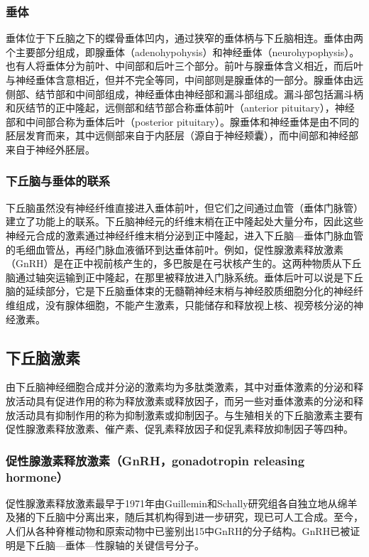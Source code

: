 \subsubsection{垂体}

垂体位于下丘脑之下的蝶骨垂体凹内，通过狭窄的垂体柄与下丘脑相连。垂体由两个主要部分组成，即腺垂体（adenohypohysis）和神经垂体（neurohypophysis）。也有人将垂体分为前叶、中间部和后叶三个部分。前叶与腺垂体含义相近，而后叶与神经垂体含意相近，但并不完全等同，中间部则是腺垂体的一部分。腺垂体由远侧部、结节部和中间部组成，神经垂体由神经部和漏斗部组成。漏斗部包括漏斗柄和灰结节的正中隆起，远侧部和结节部合称垂体前叶（anterior pituitary），神经部和中间部合称为垂体后叶（posterior pituitary）。腺垂体和神经垂体是由不同的胚层发育而来，其中远侧部来自于内胚层（源自于神经颊囊），而中间部和神经部来自于神经外胚层。

\subsubsection{下丘脑与垂体的联系}

下丘脑虽然没有神经纤维直接进入垂体前叶，但它们之间通过血管（垂体门脉管）建立了功能上的联系。下丘脑神经元的纤维末梢在正中隆起处大量分布，因此这些神经元合成的激素通过神经纤维末梢分泌到正中隆起，进入下丘脑---垂体门脉血管的毛细血管丛，再经门脉血液循环到达垂体前叶。例如，促性腺激素释放激素（GnRH）是在正中视前核产生的，多巴胺是在弓状核产生的。这两种物质从下丘脑通过轴突运输到正中隆起，在那里被释放进入门脉系统。垂体后叶可以说是下丘脑的延续部分，它是下丘脑垂体束的无髓鞘神经末梢与神经胶质细胞分化的神经纤维组成，没有腺体细胞，不能产生激素，只能储存和释放视上核、视旁核分泌的神经激素。

\subsection{下丘脑激素}

由下丘脑神经细胞合成并分泌的激素均为多肽类激素，其中对垂体激素的分泌和释放活动具有促进作用的称为释放激素或释放因子，而另一些对垂体激素的分泌和释放活动具有抑制作用的称为抑制激素或抑制因子。与生殖相关的下丘脑激素主要有促性腺激素释放激素、催产素、促乳素释放因子和促乳素释放抑制因子等四种。

\subsubsection{促性腺激素释放激素（GnRH，gonadotropin releasing hormone）}

促性腺激素释放激素最早于1971年由Guillemin和Schally研究组各自独立地从绵羊及猪的下丘脑中分离出来，随后其机构得到进一步研究，现已可人工合成。至今，人们从各种脊椎动物和原索动物中已鉴别出15中GnRH的分子结构。GnRH已被证明是下丘脑---垂体---性腺轴的关键信号分子。

